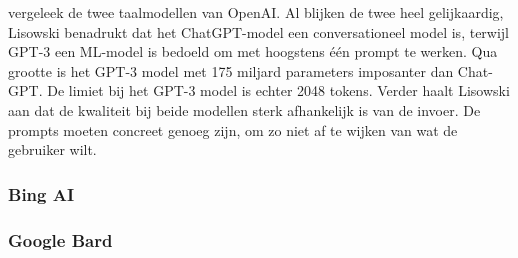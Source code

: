 
\textcite{Lisowski2023} vergeleek de twee taalmodellen van OpenAI. Al blijken de twee heel gelijkaardig, Lisowski benadrukt dat het ChatGPT-model een conversationeel model is, terwijl GPT-3 een ML-model is bedoeld om met hoogstens één prompt te werken. Qua grootte is het GPT-3 model met 175 miljard parameters imposanter dan Chat-GPT. De limiet bij het GPT-3 model is echter 2048 tokens. Verder haalt Lisowski aan dat de kwaliteit bij beide modellen sterk afhankelijk is van de invoer. De prompts moeten concreet genoeg zijn, om zo niet af te wijken van wat de gebruiker wilt.

\subsubsection{Bing AI}

\subsubsection{Google Bard}












